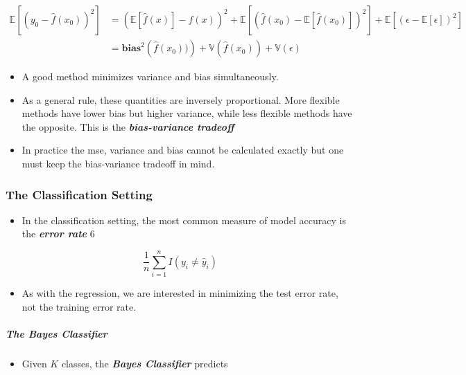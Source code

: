 \documentclass[11pt]{article}
\providecommand{\tightlist}{%
      \setlength{\itemsep}{0pt}\setlength{\parskip}{0pt}}
\begin{document}
\begin{align*}
\mathbb{E}\left[\left(y_0 - \hat{f}(x_0)\right)^2\right] 
&= \left(\mathbb{E}\left[\hat{f}(x) \right] - f(x)\right)^2 + \mathbb{E}\left[\left(\hat{f}(x_0) - \mathbb{E}\left[\hat{f}(x_0)\right]\right)^2\right] + \mathbb{E}\left[\left(\epsilon - \mathbb{E}[\epsilon]\right)^2\right]\\
&= \mathbf{bias}^2\left(\hat{f}(x_0))\right) + \mathbb{V}\left(\hat{f}(x_0)\right) + \mathbb{V}(\epsilon)
\end{align*}

\begin{itemize}
\item
  A good method minimizes variance and bias simultaneously.
\item
  As a general rule, these quantities are inversely proportional. More
  flexible methods have lower bias but higher variance, while less
  flexible methods have the opposite. This is the
  \textbf{\emph{bias-variance tradeoff}}
\item
  In practice the mse, variance and bias cannot be calculated exactly
  but one must keep the bias-variance tradeoff in mind.
\end{itemize}

    \hypertarget{the-classification-setting}{%
\subsubsection{The Classification
Setting}\label{the-classification-setting}}

    \begin{itemize}
\tightlist
\item
  In the classification setting, the most common measure of model
  accuracy is the \textbf{\emph{error rate}} 6
\end{itemize}

\[\frac{1}{n}\sum_{i=1}^n I(y_i \neq \hat{y}_i)\]

\begin{itemize}
\tightlist
\item
  As with the regression, we are interested in minimizing the test error
  rate, not the training error rate.
\end{itemize}

    \hypertarget{the-bayes-classifier}{%
\subparagraph{The Bayes Classifier}\label{the-bayes-classifier}}

    \begin{itemize}
\tightlist
\item
  Given \(K\) classes, the \textbf{\emph{Bayes Classifier}} predicts
\end{itemize}
\end{document}
